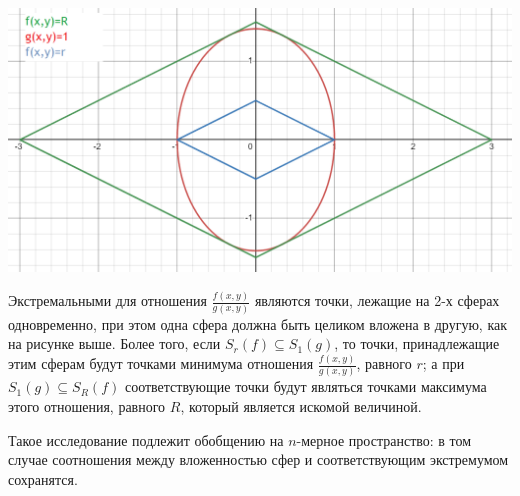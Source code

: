\documentclass{article}
\begin{document}
\vspace{2mm}
\includegraphics[scale=0.6]{pictures/spheres.png}

Экстремальными для отношения $ \frac{f(x,y)}{g(x,y)} $ являются точки, лежащие на 2-х сферах одновременно, при этом одна сфера должна быть целиком вложена в другую, как на рисунке выше. Более того, если $S_r(f) \subseteq S_1(g) $, то точки, принадлежащие этим сферам будут точками минимума отношения $ \frac{f(x,y)}{g(x,y)} $, равного $r$; а при \mbox{$S_1(g) \subseteq S_R(f)$} соответствующие точки будут являться точками максимума этого отношения, равного $R$, который является искомой величиной.

Такое исследование подлежит обобщению на $n$-мерное пространство: в том случае соотношения между вложенностью сфер и соответствующим экстремумом сохранятся.
\end{document}
